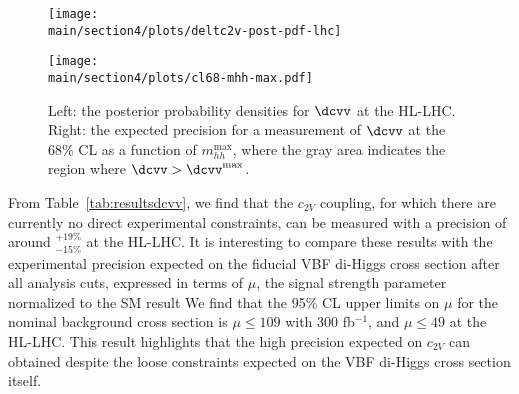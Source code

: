 \begin{figure}[h!]
	\centering
	\begin{minipage}{0.49\textwidth}\centering
		\texttt{[image: \\main/section4/plots/deltc2v-post-pdf-lhc]}
	\end{minipage}
		\begin{minipage}{0.49\textwidth}\centering
		\texttt{[image: \\main/section4/plots/cl68-mhh-max.pdf]}
	\end{minipage}
	\caption{\small Left: the
	  posterior probability densities for $\dcvv$ at the HL-LHC.
	  Right: the expected
    precision for a measurement of $\dcvv$ at the 68\% CL
          as a function of $m_{hh}^{\max}$, where
          the gray area indicates the region where $\dcvv > \dcvv^\text{max}$.
	}
	\label{fig:post-pdf} 
\end{figure}

From Table~\ref{tab:resultsdcvv}, we find that the $c_{2V}$ coupling, for which
there are currently no direct experimental constraints, can be measured 
with a precision of
around  $_{-15\%}^{+19\%}$ at the HL-LHC. 
%
It is interesting to compare these results with the experimental precision
expected on the fiducial VBF di-Higgs cross section after all
analysis cuts, expressed in terms of $\mu$, the signal strength parameter normalized to the SM result 
%
We find that the 95\% CL upper limits on $\mu$ for the nominal background cross section
is $\mu\le 109$ with 300 fb$^{-1}$, and $\mu\le 49$ at the HL-LHC.
%
This result highlights  that the high precision expected on
$c_{2V}$ can obtained despite the loose constraints expected
on the VBF di-Higgs cross section itself.

